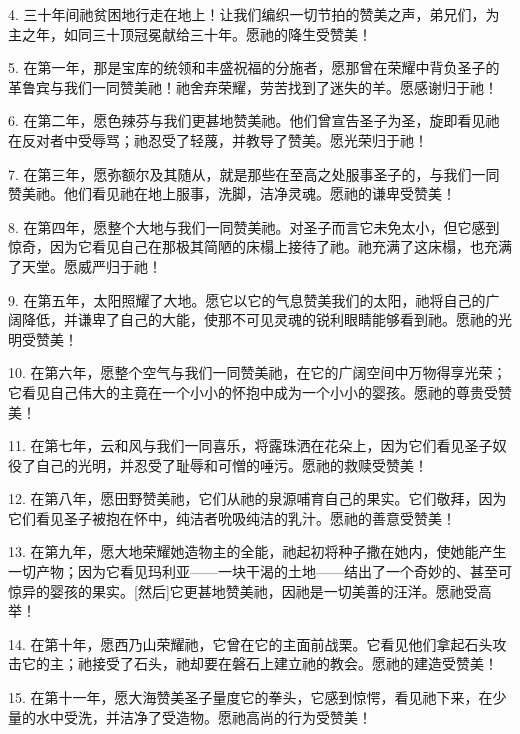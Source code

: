 4. 三十年间祂贫困地行走在地上！让我们编织一切节拍的赞美之声，弟兄们，为主之年，如同三十顶冠冕献给三十年。愿祂的降生受赞美！\par

5. 在第一年，那是宝库的统领和丰盛祝福的分施者，愿那曾在荣耀中背负圣子的革鲁宾与我们一同赞美祂！祂舍弃荣耀，劳苦找到了迷失的羊。愿感谢归于祂！\par

6. 在第二年，愿色辣芬与我们更甚地赞美祂。他们曾宣告圣子为圣，旋即看见祂在反对者中受辱骂；祂忍受了轻蔑，并教导了赞美。愿光荣归于祂！\par

7. 在第三年，愿弥额尔及其随从，就是那些在至高之处服事圣子的，与我们一同赞美祂。他们看见祂在地上服事，洗脚，洁净灵魂。愿祂的谦卑受赞美！\par

8. 在第四年，愿整个大地与我们一同赞美祂。对圣子而言它未免太小，但它感到惊奇，因为它看见自己在那极其简陋的床榻上接待了祂。祂充满了这床榻，也充满了天堂。愿威严归于祂！\par

9. 在第五年，太阳照耀了大地。愿它以它的气息赞美我们的太阳，祂将自己的广阔降低，并谦卑了自己的大能，使那不可见灵魂的锐利眼睛能够看到祂。愿祂的光明受赞美！\par

10. 在第六年，愿整个空气与我们一同赞美祂，在它的广阔空间中万物得享光荣；它看见自己伟大的主竟在一个小小的怀抱中成为一个小小的婴孩。愿祂的尊贵受赞美！\par

11. 在第七年，云和风与我们一同喜乐，将露珠洒在花朵上，因为它们看见圣子奴役了自己的光明，并忍受了耻辱和可憎的唾污。愿祂的救赎受赞美！\par

12. 在第八年，愿田野赞美祂，它们从祂的泉源哺育自己的果实。它们敬拜，因为它们看见圣子被抱在怀中，纯洁者吮吸纯洁的乳汁。愿祂的善意受赞美！\par

13. 在第九年，愿大地荣耀她造物主的全能，祂起初将种子撒在她内，使她能产生一切产物；因为它看见玛利亚——一块干渴的土地——结出了一个奇妙的、甚至可惊异的婴孩的果实。[然后]它更甚地赞美祂，因祂是一切美善的汪洋。愿祂受高举！\par

14. 在第十年，愿西乃山荣耀祂，它曾在它的主面前战栗。它看见他们拿起石头攻击它的主；祂接受了石头，祂却要在磐石上建立祂的教会。愿祂的建造受赞美！\par

15. 在第十一年，愿大海赞美圣子量度它的拳头，它感到惊愕，看见祂下来，在少量的水中受洗，并洁净了受造物。愿祂高尚的行为受赞美！\par

